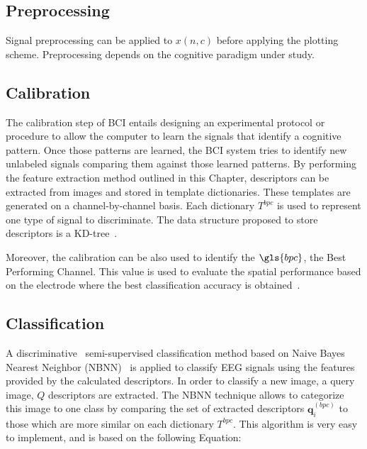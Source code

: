 \subsection{Preprocessing}

Signal preprocessing can be applied to $x(n,c)$ before applying the plotting scheme.  Preprocessing depends on the cognitive paradigm under study.  

%

\subsection{Calibration}
\label{Calibration}

The calibration step of BCI entails designing an experimental protocol or procedure to allow the computer to learn the signals that identify a cognitive pattern.  Once those patterns are learned, the BCI system tries to identify new unlabeled signals comparing them against those learned patterns.  By performing the feature extraction method outlined in this Chapter, descriptors can be extracted from images and stored in template dictionaries.  These templates are generated on a channel-by-channel basis.  Each dictionary $T^{bpc}$ is used to represent one type of signal to discriminate. The data structure proposed to store descriptors is a KD-tree~\cite{Lowe2004}.

Moreover, the calibration can be also used to identify the $\gls{bpc}$, the Best Performing Channel. This value is used to evaluate the spatial performance based on the electrode where the best classification accuracy is obtained~\cite{Chavarriaga2017}.

\subsection{Classification}
\label{nbnn}

A discriminative~\cite{WolpawJonathanR2012} semi-supervised classification method based on Naive Bayes Nearest Neighbor (NBNN)~\cite{Boiman2008} is applied to classify EEG signals using the features provided by the calculated descriptors. In order to classify a new image, a query image, $Q$ descriptors are extracted.  The NBNN technique allows to categorize this image to one class by comparing the set of extracted descriptors $\mathbf{q}_{i}^{(bpc)}$ to those which are more similar on each dictionary $T^{bpc}$.  This algorithm is very easy to implement, and is based on the following Equation:

